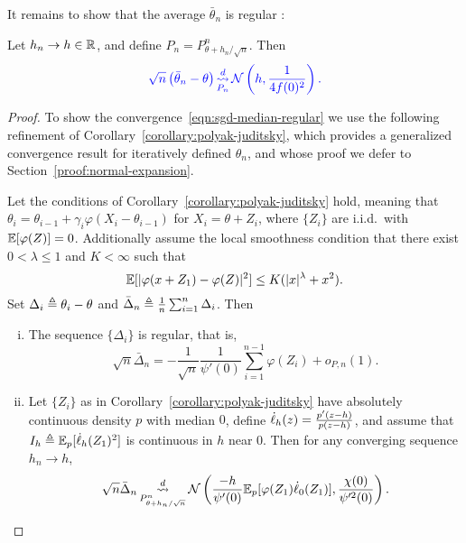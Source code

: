 It remains to show that the average $\bar{\theta}_n$ is regular :
\begin{lemma}
  \label{lemma:sgd-median-regular}
  Let $h_n \to h \in \mathbb{R}$, and define $P_n = P_{\theta + h_n / \sqrt{n}}^n$.
  Then 
  \begin{align}
    \label{eqn:sgd-median-regular}
    {\color{blue} {
    \sqrt{n}\left( \bar{\theta}_n - \theta \right)
    \mathop{\stackrel{d}{\rightsquigarrow}}_{P_n}
    \mathcal{N}\left( h,\frac{1}{4 f(0)^2}\right).
    }}
  \end{align}
\end{lemma}
\begin{proof}
  To show the convergence~\eqref{eqn:sgd-median-regular} we use the
  following refinement of Corollary~\ref{corollary:polyak-juditsky}, which
  provides a generalized convergence result for iteratively defined
  $\theta_n$, and whose
  proof we defer to Section~\ref{proof:normal-expansion}.
  \begin{corollary}
    \label{corollary:normal-expansion}
    Let the conditions of Corollary~\ref{corollary:polyak-juditsky} hold,
    meaning that $\theta_i = \theta_{i-1} + \gamma_i \varphi(X_i -
    \theta_{i-1})$ for $X_i = \theta + Z_i$, where $\{Z_i\}$ are i.i.d.\ with
    $\mathbb{E}[\varphi(Z)] = 0$. Additionally assume the local smoothness
    condition that there exist $0 < \lambda \le 1$ and $K < \infty$ such
    that
    \begin{equation}
      \label{eqn:additional-local-smooth}
      \mathbb{E}[|\varphi(x + Z_1) - \varphi(Z)|^2]
      \le K (|x|^\lambda + x^2).
    \end{equation}
    Set $\Delta_i \triangleq \theta_i - \theta$ and $\bar{\Delta}_n \triangleq \frac{1}{n}
    \sum_{i=1}^n \Delta_i$. Then
    \begin{enumerate}[(i)]
    \item \label{item:regularity}
      The sequence $\{\Delta_i\}$ is regular, that is,
      \begin{equation}
        \sqrt{n} \bar{\Delta}_n
        = -\frac{1}{\sqrt{n}} \frac{1}{\psi'(0)} \sum_{i=1}^{n-1} \varphi(Z_i)
        + o_{P,n}(1).
        \label{eq:normal_expansion_lem}
      \end{equation}
    \item \label{item:apply-le-cam} Let $\{Z_i\}$ as in
      Corollary~\ref{corollary:polyak-juditsky} have absolutely continuous
      density $p$ with median $0$, define $\dot{\ell}_h(z) = \frac{p'(z - h)}{p(z
        - h)}$, and assume that $I_h \triangleq \mathbb{E}_p[\dot{\ell}_h(Z_1)^2]$ is
      continuous in $h$ near 0.  Then for any converging sequence $h_n \to h$,
      \begin{equation*}
        \sqrt{n} \bar{\Delta}_n
        \mathop{\stackrel{d}{\rightsquigarrow}}_{P_{\theta + h_n/\sqrt{n}}^n}
        \mathcal{N}\left( \frac{-h}{\psi'(0)} \mathbb{E}_p[\varphi(Z_1) \dot{\ell}_0(Z_1)],
        \frac{\chi(0)}{\psi'^2(0)} \right).
      \end{equation*}
    \end{enumerate}
  \end{corollary}


\end{proof}
